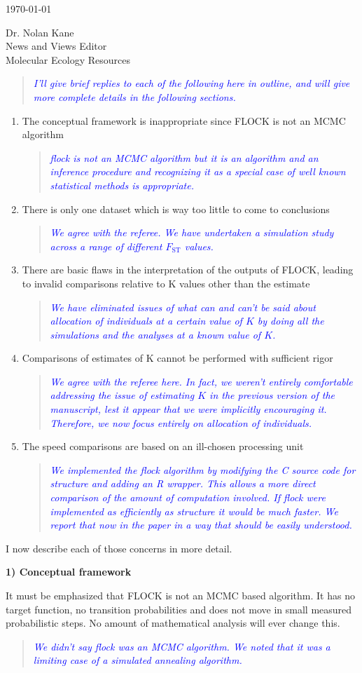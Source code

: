 \documentclass[11pt]{letter}
\newcommand{\reply}[1]{\begin{quotation}\small\sl\textcolor{blue}{#1}\end{quotation}}
\begin{document}
\begin{letter}{ \today 

Dr. Nolan Kane\\
News and Views Editor\\
Molecular Ecology Resources \\
}
\reply{I'll give brief replies to each of the following here in outline,
and will give more complete details in the following sections.}
\begin{enumerate}
\item The conceptual framework is inappropriate since FLOCK is not an MCMC algorithm
\reply{{\sc flock} is not an MCMC algorithm but it {\em is} an algorithm and an inference procedure and 
recognizing it as a special case of well known statistical methods is appropriate.}
\item There is only one dataset which is way too little to come to conclusions
\reply{We agree with the referee. We have undertaken a simulation study across a range of different $F_\mathrm{ST}$ values.}
\item There are basic flaws in the interpretation of the outputs of FLOCK, leading to invalid
comparisons relative to K values other than the estimate
\reply{We have eliminated issues of what can and can't be said about allocation of individuals  at a
certain value of $K$ by doing all the simulations and the analyses at a known value of $K$.}
\item Comparisons of estimates of K cannot be performed with sufficient rigor
\reply{We agree with the referee here.  In fact, we weren't entirely comfortable addressing the issue of estimating
$K$ in the previous version of the manuscript, lest it appear that we were implicitly encouraging it. 
Therefore, we now focus entirely on allocation of individuals.}
\item The speed comparisons are based on an ill-chosen processing unit
\reply{We implemented the {\sc flock} algorithm by modifying the C source code for {\sc structure} and
adding an R wrapper.  This allows a more direct comparison of the amount of computation involved.  If 
{\sc flock} were implemented as efficiently as {\sc structure} it would be much faster.  We report that now in the paper in a way that should be easily understood. }
\end{enumerate}

I now describe each of those concerns in more detail.

{\bf 1) Conceptual framework}

It must be emphasized that FLOCK is not an MCMC based algorithm. It has no target function, no transition probabilities and does not move in small measured probabilistic steps. No amount of mathematical analysis will ever change this. 

\reply{We didn't say {\sc flock} was an MCMC algorithm.  We noted that it was a limiting
 case of a simulated annealing algorithm.}


\end{letter}
\end{document}

